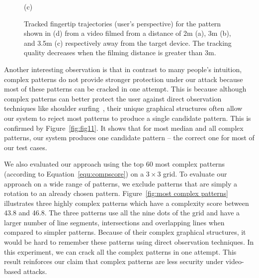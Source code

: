 \begin{figure}[!ht]
{\begin{minipage}[b]{3.8cm}
                \centering \footnotesize (c)
                \end{minipage}
            }
            \hspace{0.2cm}
                \vspace{-3mm}
            \caption{Tracked fingertip trajectories (user's perspective) for the pattern shown in (d) from a video filmed from a distance of 2m (a), 3m (b), and 3.5m (c) respectively away from the target device. The tracking quality decreases when the filming distance is greater than 3m. }
            \vspace{-3mm}
            \label{fig:distance-show}
        \end{figure}

        Another interesting observation is that in contrast to many people's
        intuition, complex patterns do not provide stronger protection under our attack because
        most of these patterns can be cracked in one attempt.
        This is because although complex patterns can better protect the user against direct observation techniques like shoulder surfing~\cite{shoulder}, their unique graphical structures
        often allow our system to reject most patterns to produce a single candidate pattern. This is
        confirmed by Figure~\ref{fig:fig11}. It shows that for most median and all complex patterns, our system produces one candidate pattern --
        the correct one for most of our test cases.


       We also evaluated our approach using the top 60 most complex
        patterns (according to Equation~\ref {equ:compscore}) on a $3 \times 3$
        grid.
        To evaluate our approach on a wide range of patterns, we exclude patterns that are simply a rotation to an already chosen pattern.
         Figure~\ref {fig:most complex patterns} illustrates three
        highly complex patterns which have a complexity score between 43.8 and 46.8. The three
        patterns use all the nine dots of the grid and have a larger number of line segments, intersections and overlapping lines when compared to simpler patterns.
        Because of their complex graphical structures, it would be hard to remember
        these patterns using direct observation techniques.
        In this experiment, we can crack all the complex patterns in one attempt. This result reinforces our claim that complex
        patterns are less security under video-based attacks.

